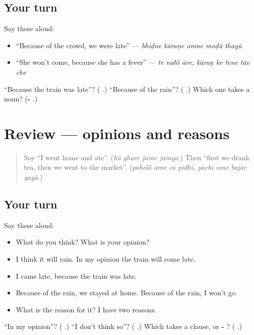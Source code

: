 \subsection*{Your turn}
Say these aloud:

\begin{itemize}
\raggedright
  \item \textquotedblleft{}Because of the crowd, we were late\textquotedblright{} — \emph{bhīḍne kāraṇe amne moḍũ thayũ}
  \item \textquotedblleft{}She won't come, because she has a fever\textquotedblright{} — \emph{te nahī̃ āve, kāraṇ ke tene tāv che}
\end{itemize}

\begin{tcolorbox}[breakable,colback=teal!4,colframe=teal!35!black,title={Before you move on}]
\textquotedblleft{}Because the train was late\textquotedblright{}? (\textbf{    }.) \textquotedblleft{}Because of the rain\textquotedblright{}? (\textbf{ }.) Which one takes a noun? (\textbf{- }.)
\end{tcolorbox}
\section[(review)]{Review — opinions and reasons}

\label{lesson:GU-R277-opinion-and-reason}



\begin{quote}
Say \textquotedblleft{}I went home and ate\textquotedblright{}. (\emph{hũ ghare jaīne jamyo}.) Then \textquotedblleft{}first we drank tea, then we went to the market\textquotedblright{}. (\emph{pahelā̃ ame cā pīdhī, pachī ame bajār gayā}.)
\end{quote}

\subsection*{Your turn}
Say these aloud:

\begin{itemize}
\raggedright
  \item What do you think? What is your opinion?
  \item I think it will rain. In my opinion the train will come late.
  \item I came late, because the train was late.
  \item Because of the rain, we stayed at home. Because of the rain, I won't go.
  \item What is the reason for it? I have two reasons.
\end{itemize}

\begin{tcolorbox}[breakable,colback=teal!4,colframe=teal!35!black,title={Before you move on}]
\textquotedblleft{}In my opinion\textquotedblright{}? (\textbf{ }.) \textquotedblleft{}I don't think so\textquotedblright{}? (\textbf{  }.) Which takes a clause, \textbf{ } or \textbf{- }? (\textbf{ }.)
\end{tcolorbox}
